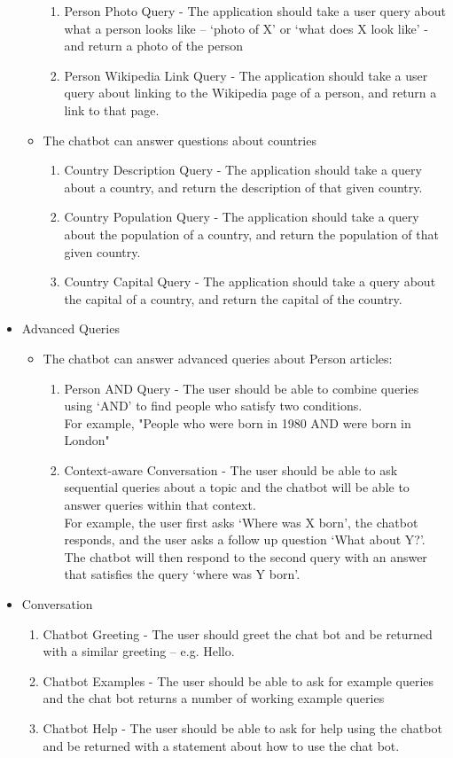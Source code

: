 \begin{itemize}
\begin{itemize}
\begin{enumerate}[resume*]
			\item Person Photo Query - The application should take a user query about what a person looks like – ‘photo of X’ or ‘what does X look like’ - and return a photo of the person
			\item Person Wikipedia Link Query - The application should take a user query about linking to the Wikipedia page of a person, and return a link to that page.
		\end{enumerate}
		\item The chatbot can answer questions about countries
		\begin{enumerate}[resume*]
			\item Country Description Query - The application should take a query about a country, and return the description of that given country.
			\item Country Population Query - The application should take a query about the population of a country, and return the population of that given country.
			\item Country Capital Query - The application should take a query about the capital of a country, and return the capital of the country.
			
		\end{enumerate}
	\end{itemize}
	\item Advanced Queries
	\begin{itemize}
		\item The chatbot can answer advanced queries about Person articles:
		\begin{enumerate}[resume*]
			\item Person AND Query - The user should be able to combine queries using ‘AND’ to find people who satisfy two conditions. \\For example, "People who were born in 1980 AND were born in London"
			\item Context-aware Conversation - The user should be able to ask sequential queries about a topic and the chatbot will be able to answer queries within that context. \\ For example, the user first asks ‘Where was X born’, the chatbot responds, and the user asks a follow up question ‘What about Y?’. The chatbot will then respond to the second query with an answer that satisfies the query ‘where was Y born’.
		\end{enumerate}
	\end{itemize}
	\item Conversation
	\begin{enumerate}[resume*]
		\item Chatbot Greeting - The user should greet the chat bot and be returned with a similar greeting – e.g. Hello.
		\item Chatbot Examples - The user should be able to ask for example queries and the chat bot returns a number of working example queries
		\item Chatbot Help - The user should be able to ask for help using the chatbot and be returned with a statement about how to use the chat bot.
	\end{enumerate}
\end{itemize}

